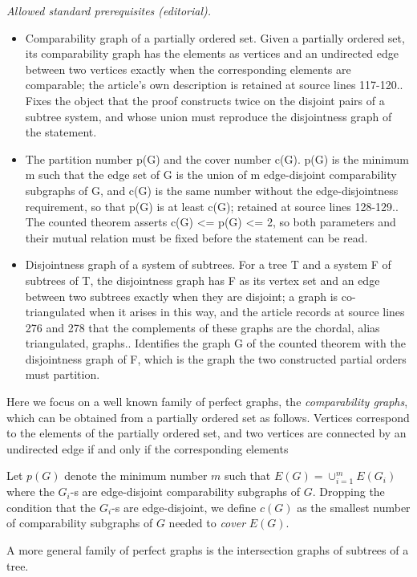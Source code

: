 \documentclass[12pt]{article}
\begin{document}
\noindent\textit{Allowed standard prerequisites (editorial).}\begin{itemize}
\item Comparability graph of a partially ordered set. Given a partially ordered set, its comparability graph has the elements as vertices and an undirected edge between two vertices exactly when the corresponding elements are comparable; the article's own description is retained at source lines 117-120.. Fixes the object that the proof constructs twice on the disjoint pairs of a subtree system, and whose union must reproduce the disjointness graph of the statement.
\item The partition number p(G) and the cover number c(G). p(G) is the minimum m such that the edge set of G is the union of m edge-disjoint comparability subgraphs of G, and c(G) is the same number without the edge-disjointness requirement, so that p(G) is at least c(G); retained at source lines 128-129.. The counted theorem asserts c(G) <= p(G) <= 2, so both parameters and their mutual relation must be fixed before the statement can be read.
\item Disjointness graph of a system of subtrees. For a tree T and a system F of subtrees of T, the disjointness graph has F as its vertex set and an edge between two subtrees exactly when they are disjoint; a graph is co-triangulated when it arises in this way, and the article records at source lines 276 and 278 that the complements of these graphs are the chordal, alias triangulated, graphs.. Identifies the graph G of the counted theorem with the disjointness graph of F, which is the graph the two constructed partial orders must partition.
\end{itemize}\medskip
Here we focus on a well known family of perfect graphs, the {\em comparability graphs},
which can be obtained from a partially ordered set as follows.
Vertices correspond to the elements of the partially ordered set,
and two vertices are connected by an undirected edge if and only if the corresponding elements

Let $p(G)$ denote the minimum number $m$ such that $E(G)=\cup_{i=1}^m E(G_i)$ where the $G_i$-s are edge-disjoint comparability subgraphs of $G$.
Dropping  the condition that the $G_i$-s are edge-disjoint, we define $c(G)$ as the smallest number of comparability subgraphs of $G$ needed to {\em cover} $E(G)$.

A more general family of perfect graphs is the intersection graphs of subtrees of a tree.
\end{document}

